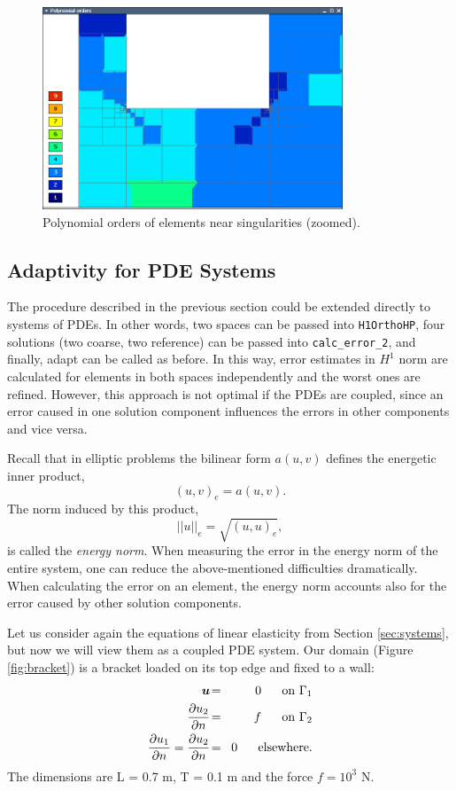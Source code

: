 \documentclass[11pt]{article}
\newcommand{\bfu}{\mbox{\boldmath $u$}}
\newcommand{\dd}[2]{\frac{\partial #1}{\partial #2}}
\begin{document}
\begin{figure}[!t]
  \medskip \centering
  \includegraphics[width=0.8\textwidth]{img/motor-orders.png}
  \caption{Polynomial orders of elements near singularities (zoomed).}
  \label{fig:motor-orders}
  \vskip 5mm
\end{figure}


\subsection{Adaptivity for PDE Systems}

The procedure described in the previous section could be extended directly to
systems of PDEs. In other words, two spaces can be passed into {\tt H1OrthoHP},
four solutions (two coarse, two reference) can be passed into {\tt calc\_error\_2},
and finally, adapt can be called as before. In this way, error estimates in
$H^1$ norm are calculated for elements in both spaces independently and the
worst ones are refined. However, this approach is not optimal if the PDEs are
coupled, since an error caused in one solution component influences the errors
in other components and vice versa.

Recall that in elliptic problems the bilinear form $a(u,v)$ defines the energetic inner product,
$$(u,v)_e = a(u,v).$$
The norm induced by this product,
$$||u||_e = \sqrt{(u,u)_e},$$
is called the {\it energy norm}.  
When measuring the error in the energy norm
of the entire system, one can reduce the above-mentioned difficulties dramatically.
When calculating the error on an element, the energy norm accounts
also for the error caused by other solution components.

Let us consider again the equations of linear elasticity from Section \ref{sec:systems}, but
now we will view them as a coupled PDE system.
Our domain (Figure \ref{fig:bracket}) is a bracket loaded on its top edge and fixed to a wall:
\begin{eqnarray*}
  \bfu \!&=&\! 0 \ \ \ \ \ \rm{on}\ \Gamma_1  \\
  \dd{u_2}{n} \!&=&\! f \ \ \ \ \ \rm{on}\ \Gamma_2 \\
  \dd{u_1}{n} = \dd{u_2}{n} \!&=&\! 0 \ \ \ \ \ \rm{elsewhere.}
\end{eqnarray*}
The dimensions are L = 0.7 m, T = 0.1 m and the force $f = 10^3$ N.
\end{document}
